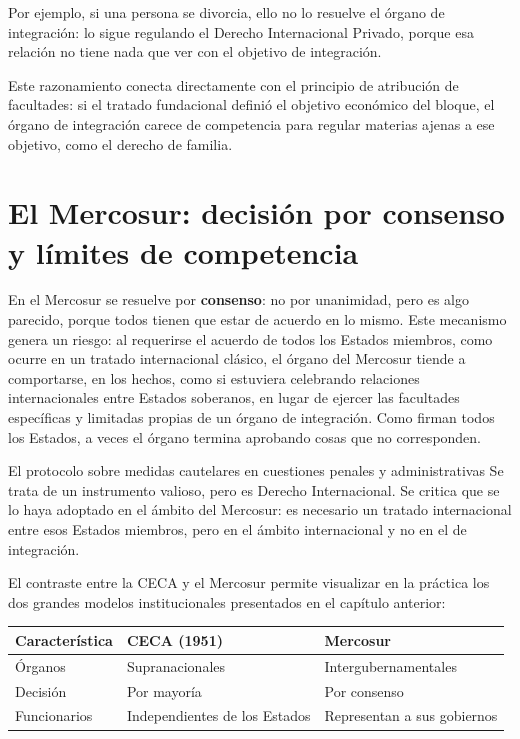 \documentclass[12pt,oneside]{book}
\begin{document}
Por ejemplo, si una persona se divorcia, ello no lo resuelve el órgano de integración: lo sigue regulando el Derecho Internacional Privado, porque esa relación no tiene nada que ver con el objetivo de integración.

Este razonamiento conecta directamente con el principio de atribución de facultades: si el tratado fundacional definió el objetivo económico del bloque, el órgano de integración carece de competencia para regular materias ajenas a ese objetivo, como el derecho de familia.

\section{El Mercosur: decisión por consenso y límites de competencia}

En el Mercosur se resuelve por \textbf{consenso}: no por unanimidad, pero es algo parecido, porque todos tienen que estar de acuerdo en lo mismo. Este mecanismo genera un riesgo: al requerirse el acuerdo de todos los Estados miembros, como ocurre en un tratado internacional clásico, el órgano del Mercosur tiende a comportarse, en los hechos, como si estuviera celebrando relaciones internacionales entre Estados soberanos, en lugar de ejercer las facultades específicas y limitadas propias de un órgano de integración. Como firman todos los Estados, a veces el órgano termina aprobando cosas que no corresponden.

\begin{example}{El protocolo sobre medidas cautelares en cuestiones penales y administrativas}
Se trata de un instrumento valioso, pero es Derecho Internacional. Se critica que se lo haya adoptado en el ámbito del Mercosur: es necesario un tratado internacional entre esos Estados miembros, pero en el ámbito internacional y no en el de integración.
\end{example}

El contraste entre la CECA y el Mercosur permite visualizar en la práctica los dos grandes modelos institucionales presentados en el capítulo anterior:

\begin{table}[H]
\centering
\small
\renewcommand{\arraystretch}{1.3}
\begin{tabularx}{\textwidth}{
    >{\raggedright\arraybackslash}p{}
    >{\raggedright\arraybackslash}X
    >{\raggedright\arraybackslash}X
}
\toprule
\textbf{Característica} & \textbf{CECA (1951)} & \textbf{Mercosur} \\
\midrule
Órganos & Supranacionales & Intergubernamentales \\
Decisión & Por mayoría & Por consenso \\
Funcionarios & Independientes de los Estados & Representan a sus gobiernos \\
\bottomrule
\end{tabularx}
\end{table}
\end{document}

